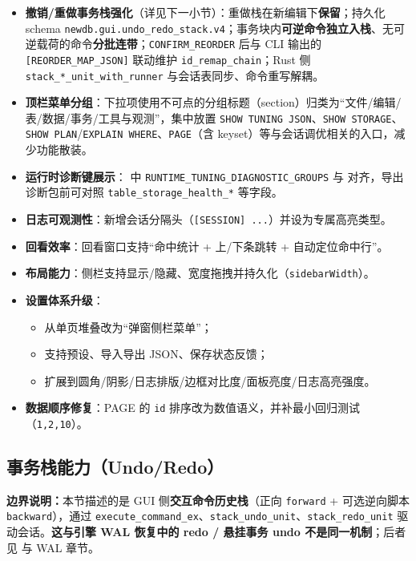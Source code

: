 \begin{itemize}
  \item \textbf{撤销/重做事务栈强化}（详见下一小节）：重做栈在新编辑下\textbf{保留}；持久化 schema \texttt{newdb.gui.undo\_redo\_stack.v4}；事务块内\textbf{可逆命令独立入栈}、无可逆载荷的命令\textbf{分批连带}；\texttt{CONFIRM\_REORDER} 后与 CLI 输出的 \texttt{[REORDER\_MAP\_JSON]} 联动维护 \texttt{id\_remap\_chain}；Rust 侧 \texttt{stack\_*\_unit\_with\_runner} 与会话表同步、命令重写解耦。
  \item \textbf{顶栏菜单分组}：下拉项使用不可点的分组标题（section）归类为“文件/编辑/表/数据/事务/工具与观测”，集中放置 \texttt{SHOW TUNING JSON}、\texttt{SHOW STORAGE}、\texttt{SHOW PLAN}/\texttt{EXPLAIN WHERE}、\texttt{PAGE}（含 keyset）等与会话调优相关的入口，减少功能散装。
  \item \textbf{运行时诊断键展示}： 中 \texttt{RUNTIME\_TUNING\_DIAGNOSTIC\_GROUPS} 与  对齐，导出诊断包前可对照 \texttt{table\_storage\_health\_*} 等字段。
  \item \textbf{日志可观测性}：新增会话分隔头（\texttt{[SESSION] ...}）并设为专属高亮类型。
  \item \textbf{回看效率}：回看窗口支持“命中统计 + 上/下条跳转 + 自动定位命中行”。
  \item \textbf{布局能力}：侧栏支持显示/隐藏、宽度拖拽并持久化（\texttt{sidebarWidth}）。
  \item \textbf{设置体系升级}：
    \begin{itemize}
      \item 从单页堆叠改为“弹窗侧栏菜单”；
      \item 支持预设、导入导出 JSON、保存状态反馈；
      \item 扩展到圆角/阴影/日志排版/边框对比度/面板亮度/日志高亮强度。
    \end{itemize}
  \item \textbf{数据顺序修复}：PAGE 的 \texttt{id} 排序改为数值语义，并补最小回归测试（\texttt{1,2,10}）。
\end{itemize}

\subsection{事务栈能力（Undo/Redo）}

\textbf{边界说明：}本节描述的是 GUI 侧\textbf{交互命令历史栈}（正向 \texttt{forward} + 可选逆向脚本 \texttt{backward}），通过 \texttt{execute\_command\_ex}、\texttt{stack\_undo\_unit}、\texttt{stack\_redo\_unit} 驱动会话。\textbf{这与引擎 WAL 恢复中的 redo / 悬挂事务 undo 不是同一机制}；后者见  与 WAL 章节。

